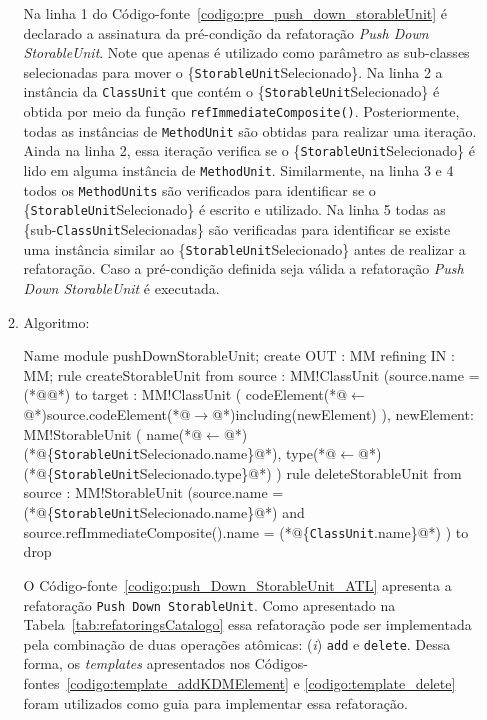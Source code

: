 \begin{enumerate}
\begin{enumerate}
Na linha 1 do Código-fonte~\ref{codigo:pre_push_down_storableUnit} é declarado a assinatura da pré-condição da refatoração \textit{Push Down StorableUnit}. Note que apenas é utilizado como parâmetro as sub-classes selecionadas para mover o \{\texttt{StorableUnit}Selecionado\}. Na linha 2 a instância da \texttt{ClassUnit} que contém o \{\texttt{StorableUnit}Selecionado\} é obtida por meio da função \texttt{refImmediateComposite()}. Posteriormente, todas as instâncias de \texttt{MethodUnit} são obtidas para realizar uma iteração. Ainda na linha 2, essa iteração verifica se o \{\texttt{StorableUnit}Selecionado\} é lido em alguma instância de \texttt{MethodUnit}. Similarmente, na linha 3 e 4 todos os \texttt{MethodUnits} são verificados para identificar se o \{\texttt{StorableUnit}Selecionado\} é escrito e utilizado. Na linha 5 todas as \{sub-\texttt{ClassUnit}Selecionadas\} são verificadas para identificar se existe uma instância similar ao \{\texttt{StorableUnit}Selecionado\} antes de realizar a refatoração. Caso a pré-condição definida seja válida a refatoração \textit{Push Down StorableUnit} é executada.
			\item Algoritmo: 
	\begin{codigo}[caption={[ATL representando a refatoração \textit{Push Down StorableUnit}.] ATL da refatoração \textit{Push Down StorableUnit}.},escapeinside={(*@}{@*)}, basicstyle=\footnotesize, label={codigo:push_Down_StorableUnit_ATL}, language=ATL]{Name}
module pushDownStorableUnit;
create OUT : MM refining IN : MM;
rule createStorableUnit {
	from
		source : MM!ClassUnit (source.name = (*@@*)
	to 
		target : MM!ClassUnit (
			codeElement(*@$\leftarrow$@*)source.codeElement(*@$\rightarrow$@*)including(newElement)
		),
		newElement: MM!StorableUnit (
			name(*@$\leftarrow$@*)(*@\{\texttt{StorableUnit}Selecionado.name\}@*),
			type(*@$\leftarrow$@*)(*@\{\texttt{StorableUnit}Selecionado.type\}@*)
		)
}
rule deleteStorableUnit {
	from
		source : MM!StorableUnit (source.name = (*@\{\texttt{StorableUnit}Selecionado.name\}@*) and source.refImmediateComposite().name = (*@\{\texttt{ClassUnit}.name\}@*) )
	to
		drop
}
\end{codigo}
O Código-fonte~\ref{codigo:push_Down_StorableUnit_ATL} apresenta a refatoração \texttt{Push Down StorableUnit}. Como apresentado na Tabela~\ref{tab:refatoringsCatalogo} essa refatoração pode ser implementada pela combinação de duas operações atômicas: (\textit{i}) \texttt{add} e \texttt{delete}. Dessa forma, os \textit{templates} apresentados nos Códigos-fontes~\ref{codigo:template_addKDMElement} e \ref{codigo:template_delete} foram utilizados como guia para implementar essa refatoração.

\end{enumerate}
\end{enumerate}
